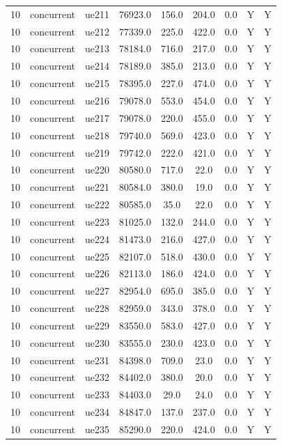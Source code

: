 \begin{table}[ht]
\begin{tabular}{|c|c|c|c|c|c|c|c|c|}
10 & concurrent & ue211 & 76923.0 & 156.0 & 204.0 & 0.0 & Y & Y \\
10 & concurrent & ue212 & 77339.0 & 225.0 & 422.0 & 0.0 & Y & Y \\
10 & concurrent & ue213 & 78184.0 & 716.0 & 217.0 & 0.0 & Y & Y \\
10 & concurrent & ue214 & 78189.0 & 385.0 & 213.0 & 0.0 & Y & Y \\
10 & concurrent & ue215 & 78395.0 & 227.0 & 474.0 & 0.0 & Y & Y \\
10 & concurrent & ue216 & 79078.0 & 553.0 & 454.0 & 0.0 & Y & Y \\
10 & concurrent & ue217 & 79078.0 & 220.0 & 455.0 & 0.0 & Y & Y \\
10 & concurrent & ue218 & 79740.0 & 569.0 & 423.0 & 0.0 & Y & Y \\
10 & concurrent & ue219 & 79742.0 & 222.0 & 421.0 & 0.0 & Y & Y \\
10 & concurrent & ue220 & 80580.0 & 717.0 & 22.0 & 0.0 & Y & Y \\
10 & concurrent & ue221 & 80584.0 & 380.0 & 19.0 & 0.0 & Y & Y \\
10 & concurrent & ue222 & 80585.0 & 35.0 & 22.0 & 0.0 & Y & Y \\
10 & concurrent & ue223 & 81025.0 & 132.0 & 244.0 & 0.0 & Y & Y \\
10 & concurrent & ue224 & 81473.0 & 216.0 & 427.0 & 0.0 & Y & Y \\
10 & concurrent & ue225 & 82107.0 & 518.0 & 430.0 & 0.0 & Y & Y \\
10 & concurrent & ue226 & 82113.0 & 186.0 & 424.0 & 0.0 & Y & Y \\
10 & concurrent & ue227 & 82954.0 & 695.0 & 385.0 & 0.0 & Y & Y \\
10 & concurrent & ue228 & 82959.0 & 343.0 & 378.0 & 0.0 & Y & Y \\
10 & concurrent & ue229 & 83550.0 & 583.0 & 427.0 & 0.0 & Y & Y \\
10 & concurrent & ue230 & 83555.0 & 230.0 & 423.0 & 0.0 & Y & Y \\
10 & concurrent & ue231 & 84398.0 & 709.0 & 23.0 & 0.0 & Y & Y \\
10 & concurrent & ue232 & 84402.0 & 380.0 & 20.0 & 0.0 & Y & Y \\
10 & concurrent & ue233 & 84403.0 & 29.0 & 24.0 & 0.0 & Y & Y \\
10 & concurrent & ue234 & 84847.0 & 137.0 & 237.0 & 0.0 & Y & Y \\
10 & concurrent & ue235 & 85290.0 & 220.0 & 424.0 & 0.0 & Y & Y \\

\end{tabular}
\end{table}
